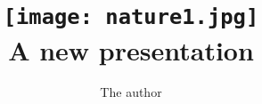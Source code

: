\documentclass{beamer}
\title{
  \centering
  \texttt{[image: nature1.jpg]}\\
  A new presentation
}
\author{The author}
\institute{The Institute that pays him}
\begin{document}
\begin{frame}
  \titlepage
\end{frame}
\end{document}

